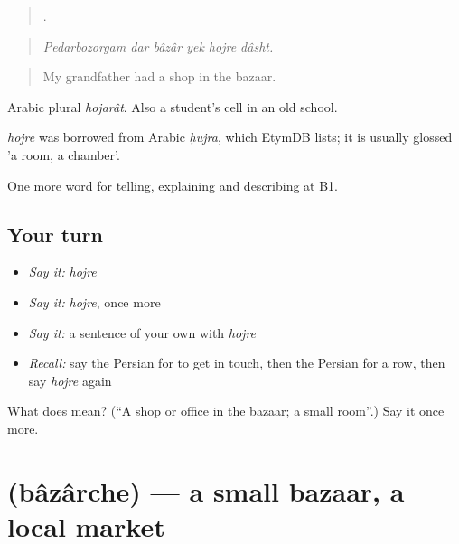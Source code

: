 \begin{quote}
     .
\end{quote}

\begin{quote}
\emph{Pedarbozorgam dar bâzâr yek hojre dâsht.}
\end{quote}

\begin{quote}
My grandfather had a shop in the bazaar.
\end{quote}

Arabic plural \emph{hojarât}. Also a student's cell in an old school.

\begin{cousinweb}
\emph{hojre} was borrowed from Arabic \emph{ḥujra}, which EtymDB lists; it is usually glossed 'a room, a chamber'.
\end{cousinweb}

\begin{grammarlens}[title={What you've built}]
One more word for telling, explaining and describing at B1.
\end{grammarlens}

\subsection*{Your turn}
\begin{itemize}
\raggedright
  \item \emph{Say it:} \emph{hojre}
  \item \emph{Say it:} \emph{hojre}, once more
  \item \emph{Say it:} a sentence of your own with \emph{hojre}
  \item \emph{Recall:} say the Persian for to get in touch, then the Persian for a row, then say \emph{hojre} again
\end{itemize}

\begin{tcolorbox}[breakable,colback=teal!4,colframe=teal!35!black,title={Before you move on}]
What does  mean? (\textquotedblleft{}A shop or office in the bazaar; a small room\textquotedblright{}.) Say it once more.
\end{tcolorbox}
\section[\texorpdfstring{\fa{بازارچه} (bâzârche)}{بازارچه (bâzârche)}]{ (bâzârche) — a small bazaar, a local market}

